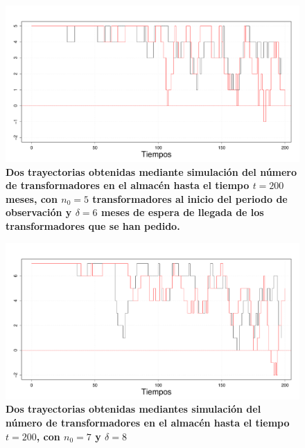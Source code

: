 \begin{figure}
\begin{center}
\includegraphics[scale=.3]{Rplot06.pdf}
\end{center}
\vspace{-1 cm} \caption{\bf Dos trayectorias obtenidas mediante simulaci\'on del n\'umero de transformadores en el almac\'en hasta el tiempo $t=200$ meses,  con $n_0=5$ transformadores al inicio del periodo de observaci\'on y $\delta=6$ meses de espera de llegada de los transformadores que se han pedido.}\label{d6}
\end{figure}
\vspace{-1.5cm}
\begin{figure}
\begin{center}
\includegraphics[scale=.3]{Rplot08.pdf}
\end{center}
\vspace{-1 cm}\caption{\bf Dos trayectorias obtenidas mediantes simulaci\'on del n\'umero de transformadores en el almac\'en hasta el tiempo $t=200$, con $n_0=7$ y $\delta=8$}\label{d8}
\end{figure}

